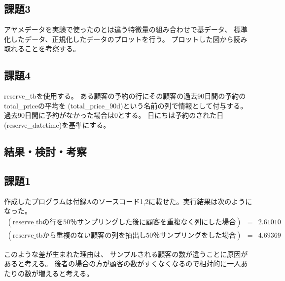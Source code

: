 \documentclass[12pt]{jarticle}
\begin{document}
\subsection{課題3}
アヤメデータを実験で使ったのとは違う特徴量の組み合わせで基データ、
標準化したデータ、正規化したデータのプロットを行う。
プロットした図から読み取れることを考察する。

\subsection{課題4}
reserve\_tbを使用する。
ある顧客の予約の行にその顧客の過去90日間の予約のtotal\_priceの平均を
(total\_price\_90d)という名前の列で情報として付与する。
過去90日間に予約がなかった場合は0とする。
日にちは予約のされた日(reserve\_datetime)を基準にする。

\clearpage

\subsection{結果・検討・考察}
\subsection{課題1}
作成したプログラムは付録Aのソースコード1,2に載せた。実行結果は次のようになった。
\begin{eqnarray}
    (\text{reserve\_tb}の行を50％サンプリングした後に顧客を重複なく列にした場合)&=& 2.61010 \nonumber \\
    (\text{reserve\_tb}から重複のない顧客の列を抽出し50％サンプリングをした場合)&=& 4.69369 \nonumber
\end{eqnarray}

このような差が生まれた理由は、
サンプルされる顧客の数が違うことに原因があると考える。
後者の場合の方が顧客の数がすくなくなるので相対的に一人あたりの数が増えると考える。
\end{document}
